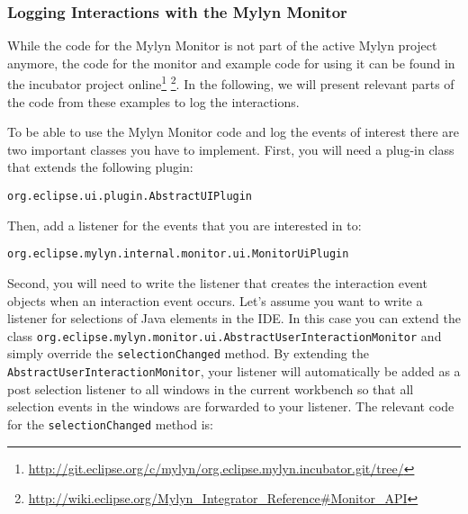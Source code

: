 

\subsubsection{Logging Interactions with the Mylyn Monitor}
	While the code for the Mylyn Monitor is not part of the active Mylyn project anymore, the code for the monitor and example code for using it can be found in the incubator project online\footnote{\url{http://git.eclipse.org/c/mylyn/org.eclipse.mylyn.incubator.git/tree/}} \footnote{\url{http://wiki.eclipse.org/Mylyn_Integrator_Reference\#Monitor_API}}. In the following, we will present relevant parts of the code from these examples to log the interactions.

To be able to use the Mylyn Monitor code and log the events of interest there are two important classes you have to implement. First, you will need a plug-in class that extends 
the following plugin: 

\begin{lstlisting}
org.eclipse.ui.plugin.AbstractUIPlugin
\end{lstlisting}

\noindent
Then, add a listener for the events that you are interested in to:

\begin{lstlisting}
org.eclipse.mylyn.internal.monitor.ui.MonitorUiPlugin 
\end{lstlisting}

Second, you will need to write the listener that creates the interaction event objects when an interaction event occurs. Let's assume you want to write a listener for selections of Java elements in the IDE. In this case you can extend the class \texttt{org.eclipse.mylyn.monitor.ui.AbstractUserInteractionMonitor} and simply override the \texttt{selectionChanged} method. By extending the \texttt{AbstractUserInteractionMonitor}, your listener will automatically be added as a post selection listener to all windows in the current workbench so that all selection events in the windows are forwarded to your listener. The relevant code for the \texttt{selectionChanged} method is:


